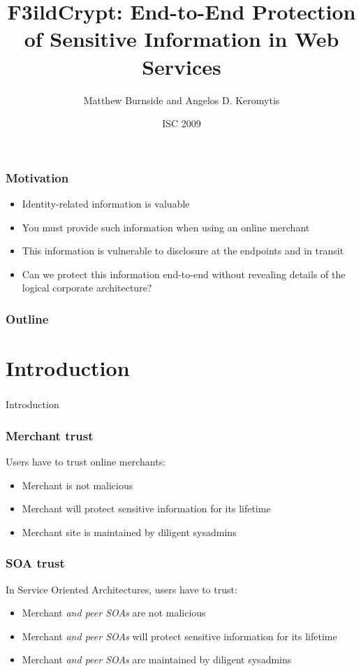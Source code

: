\documentclass{beamer}
\title[F3ildCrypt]{F3ildCrypt: End-to-End Protection of Sensitive Information
in Web Services}
\author[Burnside, Keromytis]{Matthew Burnside and Angelos D. Keromytis}
\institute[Columbia University]{
Department of Computer Science\\
Columbia University\\
\texttt{\{mb, angelos\}@cs.columbia.edu}
}
\date{ISC 2009}
\begin{document}
\begin{frame}[plain]
    \titlepage
\end{frame}

\begin{frame}
\frametitle{Motivation}
\begin{itemize}
\item Identity-related information is valuable
\item You must provide such information when using an online merchant
\item This information is vulnerable to disclosure at the endpoints and in
transit 
\item Can we protect this information end-to-end without revealing details of
the logical corporate architecture?
\end{itemize}
\end{frame}

\begin{frame}
\frametitle{Outline}
\tableofcontents
\end{frame}

\section{Introduction}
\begin{frame}
\frametitle{}
\begin{center}
Introduction
\end{center}
\end{frame}

\begin{frame}
\frametitle{Merchant trust}
Users have to trust online merchants:
\smallskip
\begin{itemize}
\item Merchant is not malicious
\item Merchant will protect sensitive information for its lifetime
\item Merchant site is maintained by diligent sysadmins
\end{itemize}
\end{frame}

\begin{frame}
\frametitle{SOA trust}
In Service Oriented Architectures, users have to trust:
\smallskip
\begin{itemize}
\item Merchant \emph{and peer SOAs} are not malicious
\item Merchant \emph{and peer SOAs} will protect sensitive information for its
lifetime
\item Merchant \emph{and peer SOAs} are maintained by diligent sysadmins
\end{itemize}
\end{frame}
\end{document}
